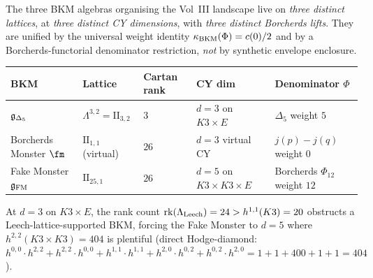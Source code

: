 \begin{theorem}
\label{wn:thm:spine-dimension-census}
The three BKM algebras organising the Vol~III landscape live on
\emph{three distinct lattices}, at \emph{three distinct CY dimensions},
with \emph{three distinct Borcherds lifts}. They are unified by the
universal weight identity $\kappa_{\mathrm{BKM}}(\Phi) = c(0)/2$ and by a
Borcherds-functorial denominator restriction, \emph{not} by synthetic
envelope enclosure.

\begin{center}
\begin{tabular}{lllll}
\toprule
BKM & Lattice & Cartan rank & CY dim & Denominator $\Phi$ \\
\midrule
$\mathfrak{g}_{\Delta_5}$ & $\Lambda^{3,2} = \mathrm{II}_{3,2}$ & $3$ &
$d = 3$ on $K3 \times E$ & $\Delta_5$ weight $5$ \\
Borcherds Monster $\fm$ & $\mathrm{II}_{1,1}$ (virtual) & $26$ &
$d = 3$ virtual CY & $j(p) - j(q)$ weight $0$ \\
Fake Monster $\mathfrak{g}_{\mathrm{FM}}$ & $\mathrm{II}_{25,1}$ & $26$ &
$d = 5$ on $K3 \times K3 \times E$ & Borcherds $\Phi_{12}$ weight $12$\\
\bottomrule
\end{tabular}
\end{center}

At $d = 3$ on $K3 \times E$, the rank count
$\mathrm{rk}(\Lambda_{\mathrm{Leech}}) = 24 > h^{1,1}(K3) = 20$ obstructs a
Leech-lattice-supported BKM, forcing the Fake Monster to $d = 5$ where
$h^{2,2}(K3 \times K3) = 404$ is plentiful (direct Hodge-diamond:
$h^{0,0}\cdot h^{2,2} + h^{2,2} \cdot h^{0,0} + h^{1,1}\cdot h^{1,1}
+ h^{2,0}\cdot h^{0,2} + h^{0,2}\cdot h^{2,0}
= 1 + 1 + 400 + 1 + 1 = 404$).


\end{theorem}
